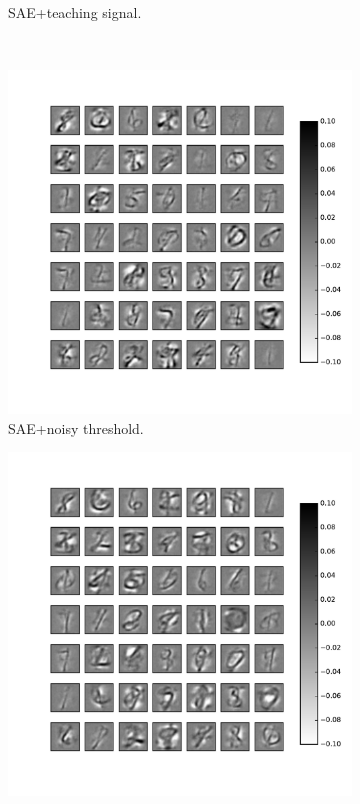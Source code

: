 \begin{figure}
\begin{subfigure}[t]{0.4\textwidth}
		\caption{SAE+teaching signal.}
	\end{subfigure}\\
	\begin{subfigure}[t]{0.4\textwidth}
		\includegraphics[width=\textwidth]{pics_sdlm/noise_ae/2_60000_0.pdf}
		\caption{SAE+noisy threshold.}
	\end{subfigure}
	\begin{subfigure}[t]{0.4\textwidth}
		\includegraphics[width=\textwidth]{pics_sdlm/43_MNIST_SAE_all/2_60000_0.pdf}

\end{subfigure}
\end{figure}
